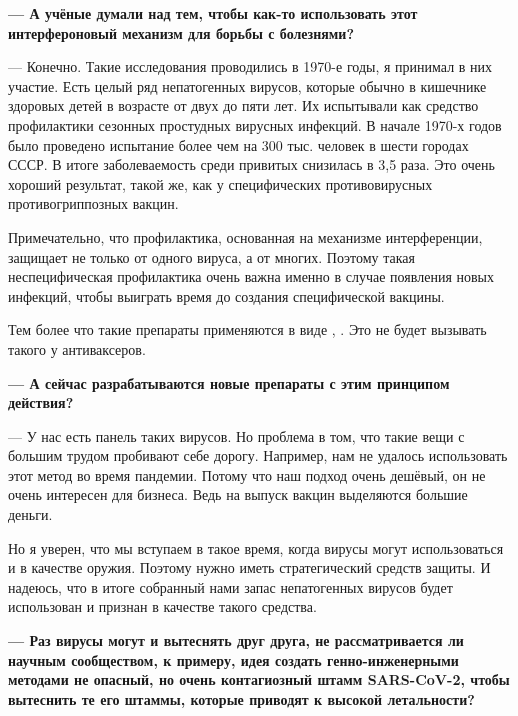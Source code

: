 {\bf --- А учёные думали над тем, чтобы как-то использовать этот интерфероновый механизм для борьбы с болезнями?}

--- Конечно. Такие исследования проводились в 1970-е годы, я принимал в них участие. Есть целый ряд непатогенных вирусов, которые обычно  в кишечнике здоровых детей в возрасте от двух до пяти лет. Их испытывали как средство профилактики сезонных простудных вирусных инфекций. В начале 1970-х годов было проведено  испытание более чем на 300 тыс. человек в шести городах СССР. В итоге заболеваемость  среди привитых снизилась в 3,5 раза. Это очень хороший результат, такой же, как у специфических противовирусных противогриппозных вакцин.

\begin{fancyquotes}
    Примечательно, что профилактика, основанная на механизме интерференции, защищает не только от одного вируса, а от многих. Поэтому такая неспецифическая профилактика очень важна именно в случае появления новых инфекций, чтобы выиграть время до создания специфической вакцины.
\end{fancyquotes}

Тем более что такие препараты применяются в виде , . Это не будет вызывать такого  у антиваксеров.

{\bf --- А сейчас разрабатываются новые препараты с этим принципом действия?}

--- У нас есть панель таких вирусов. Но проблема в том, что такие вещи с большим трудом пробивают себе дорогу. Например, нам не удалось  использовать этот метод во время  пандемии. Потому что наш подход очень дешёвый, он не очень интересен для бизнеса. Ведь на выпуск вакцин выделяются большие деньги.

Но я уверен, что мы вступаем в такое время, когда вирусы могут использоваться и в качестве оружия. Поэтому нужно иметь стратегический   средств защиты. И надеюсь, что в итоге собранный нами запас непатогенных вирусов будет использован и признан в качестве такого средства.

{\bf --- Раз вирусы могут  и вытеснять друг друга, не рассматривается ли научным сообществом, к примеру, идея создать генно-инженерными методами не опасный, но очень контагиозный штамм SARS-CoV-2, чтобы вытеснить те его штаммы, которые приводят к высокой летальности? }

